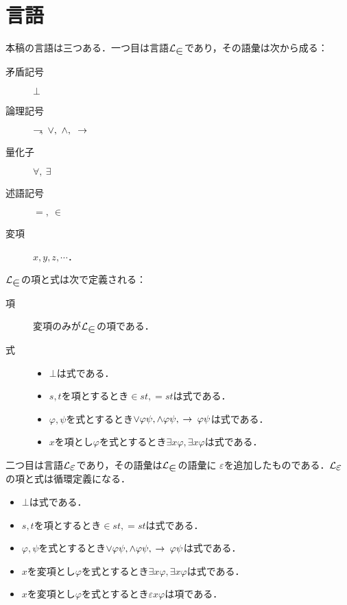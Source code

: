 \documentclass[twocolumn,10pt]{jarticle}
\theoremstyle{mystyle}
\newcommand{\lang}[1]{\mathcal{L}_{\scalebox{1.2}{$#1$}}} %
\newcommand{\negation}{\rightharpoondown\hspace{-0.25em}} %
\newcommand{\rarrow}{\hspace{0.25em}\rightarrow\hspace{0.25em}} %
\begin{document}
\section{言語}
	本稿の言語は三つある．一つ目は言語$\lang{\in}$であり，その語彙は次から成る：
	\begin{description}
		\item[矛盾記号] $\bot$
		\item[論理記号] $\negation,\ \vee,\ \wedge,\ \rarrow$
		\item[量化子] $\forall,\ \exists$
		\item[述語記号] $=,\ \in$
		\item[変項] $x,y,z,\cdots$．
	\end{description}
	
	$\lang{\in}$の項と式は次で定義される：
	
	\begin{description}
		\item[項] 変項のみが$\lang{\in}$の項である．
		\item[式] 
			\begin{itemize}
				\item $\bot$は式である．
				\item $s,t$を項とするとき$\in st, =st$は式である．
				\item $\varphi,\psi$を式とするとき$\vee \varphi\psi,\wedge \varphi \psi,\rarrow \varphi \psi$は式である．
				\item $x$を項とし$\varphi$を式とするとき$\exists x \varphi,\exists x \varphi$は式である．
			\end{itemize}
	\end{description}
	
	二つ目は言語$\lang{\varepsilon}$であり，その語彙は$\lang{\in}$の語彙に
	$\varepsilon$を追加したものである．$\lang{\varepsilon}$の項と式は循環定義になる．
	
	\begin{itemize}
		\item $\bot$は式である．
		\item $s,t$を項とするとき$\in st, =st$は式である．
		\item $\varphi,\psi$を式とするとき$\vee \varphi\psi,\wedge \varphi \psi,\rarrow \varphi \psi$は式である．
		\item $x$を変項とし$\varphi$を式とするとき$\exists x \varphi,\exists x \varphi$は式である．
		\item $x$を変項とし$\varphi$を式とするとき$\varepsilon x \varphi$は項である．
	\end{itemize}
	
\end{document}
